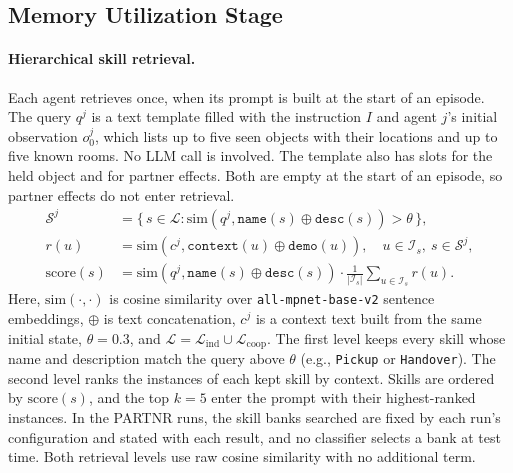 \documentclass{article}
\theoremstyle{plain}
\theoremstyle{definition}
\theoremstyle{remark}
\begin{document}
\subsection{Memory Utilization Stage}
\label{subsec:utilization}
\label{subsec:memory_utilization}
 
\paragraph{Hierarchical skill retrieval.}
Each agent retrieves once, when its prompt is built at the start of an episode. The query $q^j$ is a text template filled with the instruction $I$ and agent $j$'s initial observation $o_0^j$, which lists up to five seen objects with their locations and up to five known rooms. No LLM call is involved. The template also has slots for the held object and for partner effects. Both are empty at the start of an episode, so partner effects do not enter retrieval.
\begin{equation}
\begin{aligned}
\mathcal{S}^j &= \{\, s \in \mathcal{L} : \text{sim}(q^j, \texttt{name}(s)\oplus\texttt{desc}(s)) > \theta \,\}, \\
r(u) &= \text{sim}(c^j, \texttt{context}(u)\oplus\texttt{demo}(u)), \quad u \in \mathcal{I}_s,\ s \in \mathcal{S}^j, \\
\text{score}(s) &= \text{sim}(q^j, \texttt{name}(s)\oplus\texttt{desc}(s)) \cdot \tfrac{1}{|\mathcal{I}_s|}\textstyle\sum_{u \in \mathcal{I}_s} r(u).
\end{aligned}
\end{equation}
Here, $\text{sim}(\cdot,\cdot)$ is cosine similarity over \texttt{all-mpnet-base-v2} sentence embeddings, $\oplus$ is text concatenation, $c^j$ is a context text built from the same initial state, $\theta=0.3$, and $\mathcal{L}=\mathcal{L}_{\text{ind}}\cup\mathcal{L}_{\text{coop}}$. The first level keeps every skill whose name and description match the query above $\theta$ (e.g., \texttt{Pickup} or \texttt{Handover}). The second level ranks the instances of each kept skill by context. Skills are ordered by $\text{score}(s)$, and the top $k=5$ enter the prompt with their highest-ranked instances. In the PARTNR runs, the skill banks searched are fixed by each run's configuration and stated with each result, and no classifier selects a bank at test time. Both retrieval levels use raw cosine similarity with no additional term.
 
 
\end{document}
